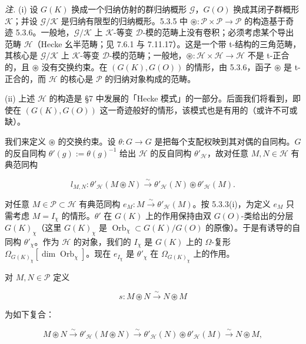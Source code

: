  \emph{注.} (i) 设 $G(K)$ 换成一个归纳仿射的群归纳概形 $\mathcal{G}$，$G(O)$ 换成其闭子群概形 $\mathcal{K}$；并设 $\mathcal{G}/\mathcal{K}$ 是归纳有限型的归纳概形。5.3.5 中 $\circledast:\mathcal{P}\times\mathcal{P}\to\mathcal{P}$ 的构造基于奇迹 5.3.6。一般地，$\mathcal{G}/\mathcal{K}$ 上 $\mathcal{K}$-等变 $\mathcal{D}$-模的范畴上没有卷积；必须考虑某个导出范畴 $\mathcal{H}$（Hecke 幺半范畴；见 7.6.1 与 7.11.17）。这是一个带 t-结构的三角范畴，其核心是 $\mathcal{G}/\mathcal{K}$ 上 $\mathcal{K}$-等变 $\mathcal{D}$-模的范畴；一般地，$\circledast:\mathcal{H}\times\mathcal{H}\to\mathcal{H}$ 不是 t-正合的，且 $\circledast$ 没有交换约束。在 $(G(K),G(O))$ 的情形，由 5.3.6，函子 $\circledast$ 是 t-正合的，而 $\mathcal{H}$ 的核心是 $\mathcal{P}$ 的归纳对象构成的范畴。

(ii) 上述 $\mathcal{H}$ 的构造是 §7 中发展的「Hecke 模式」的一部分。后面我们将看到，即使在 $(G(K),G(O))$ 这一奇迹般好的情形，该模式也是有用的（或许不可或缺）。

 我们来定义 $\circledast$ 的交换约束。设 $\theta:G\to G$ 是把每个支配权映到其对偶的自同构。$G$ 的反自同构 $\theta'(g):=\theta(g)^{-1}$ 给出 $\mathcal{H}$ 的反自同构 $\theta'_{\mathcal{H}}$，故对任意 $M,N\in\mathcal{H}$ 有典范同构

\[
l_{M,N}:\theta'_{\mathcal{H}}(M\circledast N)\xrightarrow{\sim}\theta'_{\mathcal{H}}(N)\circledast\theta'_{\mathcal{H}}(M).
\]

对任意 $M\in\mathcal{P}\subset\mathcal{H}$ 有典范同构 $e_M:M\xrightarrow{\sim}\theta'_{\mathcal{H}}(M)$。按 5.3.3(i)，为定义 $e_M$ 只需考虑 $M=I_\chi$ 的情形。$\theta'$ 在 $G(K)$ 上的作用保持由双 $G(O)$-类给出的分层 $G(K)_\chi$（这里 $G(K)_\chi$ 是 $\operatorname{Orb}_\chi\subset G(K)/G(O)$ 的原像）。于是有诱导的自同构 $\theta'_\chi$。作为 $\mathcal{H}$ 的对象，我们的 $I_\chi$ 是 $G(K)$ 上的 $\Omega$-复形 $\Omega_{G(K)_\chi}[\dim\operatorname{Orb}_\chi]$。现在 $e_{I_\chi}$ 是 $\theta'_\chi$ 在 $\Omega_{G(K)_\chi}$ 上的作用。

对 $M,N\in\mathcal{P}$ 定义

\begin{equation}\tag{261}
s:M\circledast N\xrightarrow{\sim}N\circledast M
\end{equation}

为如下复合：

\[
M\circledast N\xrightarrow{\sim}\theta'_{\mathcal{H}}(M\circledast N)\xrightarrow{\sim}\theta'_{\mathcal{H}}(N)\circledast\theta'_{\mathcal{H}}(M)\xrightarrow{\sim}N\circledast M,
\]

